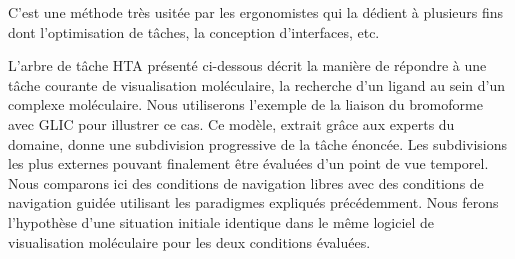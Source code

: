 C'est une méthode très usitée par les ergonomistes qui la dédient à plusieurs fins dont l'optimisation de tâches, la conception d'interfaces, etc.


L'arbre de tâche HTA présenté ci-dessous décrit la manière de répondre à une tâche courante de visualisation moléculaire, la recherche d'un ligand au sein d'un complexe moléculaire. Nous utiliserons l'exemple de la liaison du bromoforme avec GLIC pour illustrer ce cas. Ce modèle, extrait grâce aux experts du domaine, donne une subdivision progressive de la tâche énoncée. Les subdivisions les plus externes pouvant finalement être évaluées d'un point de vue temporel. Nous comparons ici des conditions de navigation libres avec des conditions de navigation guidée utilisant les paradigmes expliqués précédemment. Nous ferons l'hypothèse d'une situation initiale identique dans le même logiciel de visualisation moléculaire pour les deux conditions évaluées.
\\
\\
\\
\\
\\

